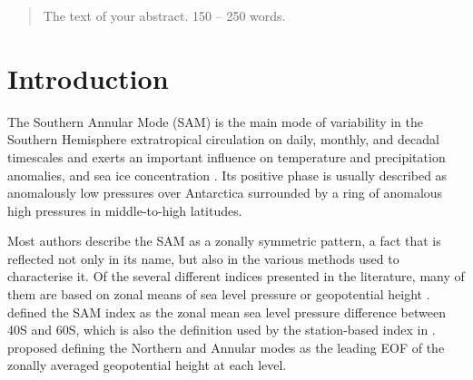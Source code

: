 \documentclass[smallextended]{svjour3}       %
\begin{document}
\date{Received: date / Accepted: date}


\maketitle

\begin{abstract}
The text of your abstract. 150 -- 250 words.
\\


\end{abstract}


\def\spacingset#1{\renewcommand{\baselinestretch}%
{#1}\small\normalsize} \spacingset{1}


\hypertarget{introduction}{%
\section{Introduction}\label{introduction}}

The Southern Annular Mode (SAM) is the main mode of variability in the Southern Hemisphere extratropical circulation \citep{rogers1982} on daily, monthly, and decadal timescales \citep{baldwin2001a, fogt2006} and exerts an important influence on temperature and precipitation anomalies, and sea ice concentration \citep[e.g.][]{fogt2020}. Its positive phase is usually described as anomalously low pressures over Antarctica surrounded by a ring of anomalous high pressures in middle-to-high latitudes.

Most authors describe the SAM as a zonally symmetric pattern, a fact that is reflected not only in its name, but also in the various methods used to characterise it. Of the several different indices presented in the literature, many of them are based on zonal means of sea level pressure or geopotential height \citep{ho2012}. \citet{gong1999} defined the SAM index as the zonal mean sea level pressure difference between 40\degree S and 60\degree S, which is also the definition used by the station-based index in \citet{marshall2003}. \citet{baldwin2009} proposed defining the Northern and Annular modes as the leading EOF of the zonally averaged geopotential height at each level.
\end{document}
